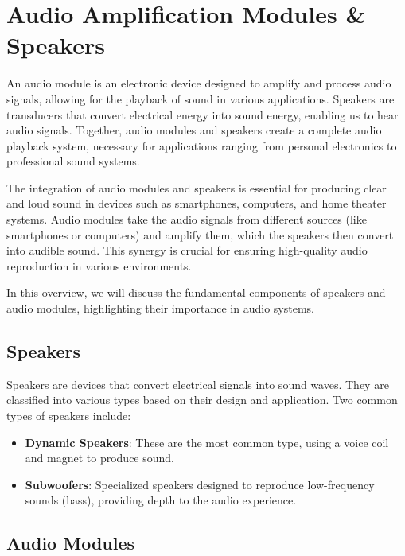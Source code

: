 \section{Audio Amplification Modules \& Speakers}

An audio module is an electronic device designed to amplify and process audio signals, allowing for the playback of sound in various applications. Speakers are transducers that convert electrical energy into sound energy, enabling us to hear audio signals. Together, audio modules and speakers create a complete audio playback system, necessary for applications ranging from personal electronics to professional sound systems.

The integration of audio modules and speakers is essential for producing clear and loud sound in devices such as smartphones, computers, and home theater systems. Audio modules take the audio signals from different sources (like smartphones or computers) and amplify them, which the speakers then convert into audible sound. This synergy is crucial for ensuring high-quality audio reproduction in various environments.

In this overview, we will discuss the fundamental components of speakers and audio modules, highlighting their importance in audio systems.

\subsection{Speakers}

Speakers are devices that convert electrical signals into sound waves. They are classified into various types based on their design and application. Two common types of speakers include:

\begin{itemize}
	\item \textbf{Dynamic Speakers}: These are the most common type, using a voice coil and magnet to produce sound.
	\item \textbf{Subwoofers}: Specialized speakers designed to reproduce low-frequency sounds (bass), providing depth to the audio experience.
\end{itemize}

\subsection{Audio Modules}


